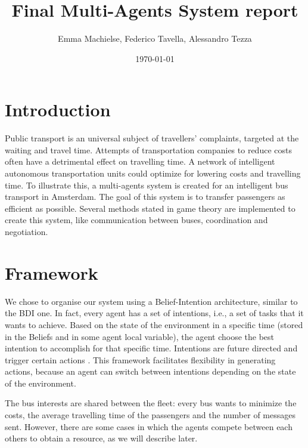 \documentclass[a4paper]{article}
\title{Final Multi-Agents System report}
\author{Emma Machielse, Federico Tavella, Alessandro Tezza}
\date{\today}
\begin{document}
\maketitle


\section{Introduction}
Public transport is an universal subject of travellers' complaints, targeted at the waiting and travel time. Attempts of transportation companies to reduce costs often have a detrimental effect on travelling time. A network of intelligent autonomous transportation units could optimize for lowering costs and travelling time. To illustrate this, a multi-agents system is created for an intelligent bus transport in Amsterdam. The goal of this system is to transfer passengers as efficient as possible. Several methods stated in game theory \cite{intromultiagentsystems} are implemented to create this system, like communication between buses, coordination and negotiation. 

\section{Framework}

We chose to organise our system using a Belief-Intention architecture, similar to the BDI one\cite{caillou2017simple}. In fact, every agent has a set of intentions, i.e.,  a set of tasks that it wants to achieve. Based on the state of the environment in a specific time (stored in the Beliefs and in some agent local variable), the agent choose the best intention to accomplish for that specific time. Intentions are future directed and trigger certain actions \cite{multiagentsystems}. This framework facilitates flexibility in generating actions, because an agent can switch between intentions depending on the state of the environment. 

The bus interests are shared between the fleet: every bus wants to minimize the costs, the average travelling time of the passengers and the number of messages sent. However, there are some cases in which the agents compete between each others to obtain a resource, as we will describe later.
\end{document}
